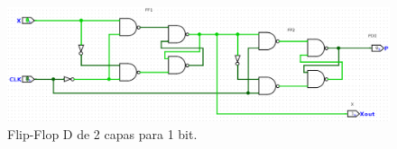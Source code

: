 \documentclass[12pt]{article}
\begin{document}
\begin{figure}[h]
\includegraphics[scale=.3]{logicFlip-FlopD.png}
\caption{Flip-Flop D de 2 capas para 1 bit.}
\label{fig:ffd2c}
\end{figure}
\end{document}
